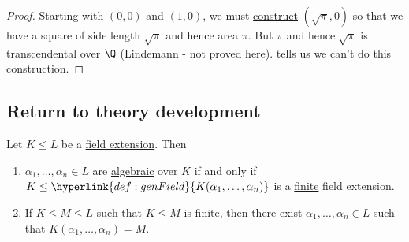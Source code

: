 \documentclass{article}
\begin{document}
\begin{proof}
    Starting with $(0, 0)$ and $(1, 0)$, we must \hyperlink{def:constructible}{construct} $(\sqrt{\pi}, 0)$ so that we have a square of side length $\sqrt{\pi}$ and hence area $\pi$.
    But $\pi$ and hence $\sqrt{\pi}$ is transcendental over $\Q$ (Lindemann - not proved here).
     tells us we can't do this construction.
\end{proof}

\subsection{Return to theory development}
\begin{nlemma}\label{lem:1.19}
    Let $K \leq L$ be a \hyperlink{def:fieldExt}{field extension}. Then
    \begin{enumerate}[label=(\roman*)]
        \item $\alpha_1, \dotsc, \alpha_n \in L$ are \hyperlink{def:algebraic}{algebraic} over $K$ if and only if $K \leq \hyperlink{def:genField}{K(\alpha_1, \dotsc, \alpha_n)}$ is a \hyperlink{def:degreeOfFieldExt}{finite} field extension.
        \item If $K \leq M \leq L$ such that $K \leq M$ is \hyperlink{def:degreeOfFieldExt}{finite}, then there exist $\alpha_1, \dotsc, \alpha_n \in L$ such that $K(\alpha_1, \dotsc, \alpha_n) = M$.
    \end{enumerate}
\end{nlemma}
\end{document}
